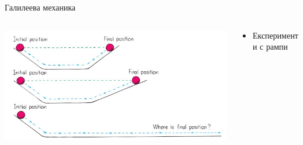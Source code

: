 \documentclass[10pt,a4paper]{beamer}
\begin{document}
        \begin{frame}{ Галилеева механика }
            \begin{columns}
                \begin{column}{0.5\textwidth}
                    \includegraphics[width=\textwidth]{images/galilei_ramps.jpg}
                \end{column}
                \begin{column}{0.5\textwidth}
                    \begin{itemize}
                        \item Експерименти с рампи
                    \end{itemize}
                \end{column}
            \end{columns}
        \end{frame}
    
\end{document}
